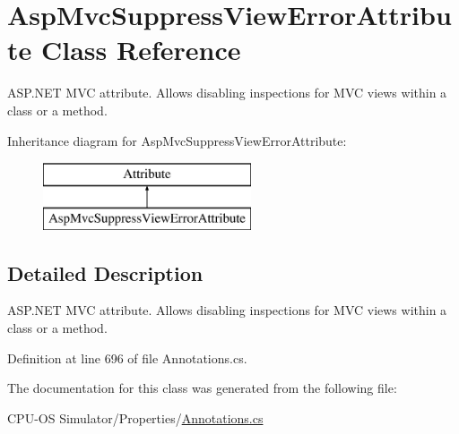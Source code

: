 \hypertarget{class_asp_mvc_suppress_view_error_attribute}{}\section{Asp\+Mvc\+Suppress\+View\+Error\+Attribute Class Reference}
\label{class_asp_mvc_suppress_view_error_attribute}


A\+S\+P.\+N\+E\+T M\+V\+C attribute. Allows disabling inspections for M\+V\+C views within a class or a method.  


Inheritance diagram for Asp\+Mvc\+Suppress\+View\+Error\+Attribute\+:\begin{figure}[H]
\begin{center}
\leavevmode
\includegraphics[height=2.000000cm]{class_asp_mvc_suppress_view_error_attribute}
\end{center}
\end{figure}


\subsection{Detailed Description}
A\+S\+P.\+N\+E\+T M\+V\+C attribute. Allows disabling inspections for M\+V\+C views within a class or a method. 



Definition at line 696 of file Annotations.\+cs.



The documentation for this class was generated from the following file\+:\begin{DoxyCompactItemize}
\item 
C\+P\+U-\/\+O\+S Simulator/\+Properties/\hyperlink{_annotations_8cs}{Annotations.\+cs}\end{DoxyCompactItemize}

